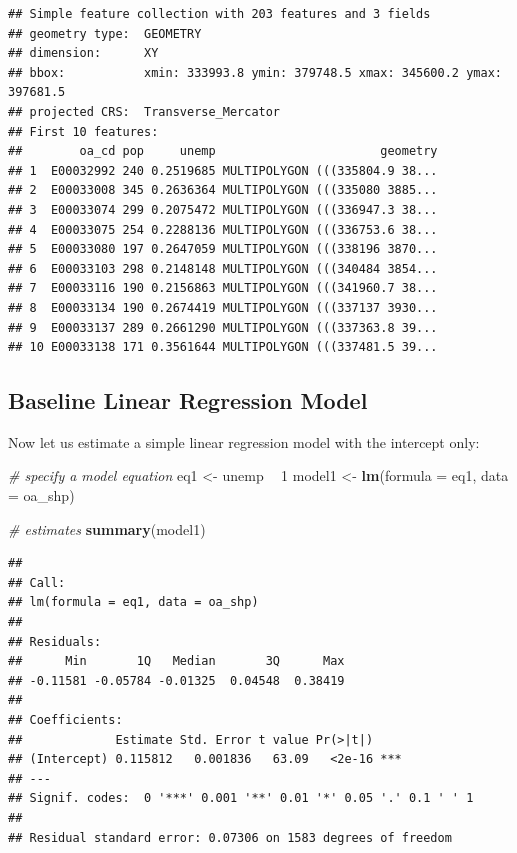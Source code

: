 \documentclass[
]{book}
\newenvironment{Shaded}{\begin{snugshade}}{\end{snugshade}}
\newcommand{\CommentTok}[1]{\textcolor[rgb]{0.56,0.35,0.01}{\textit{#1}}}
\newcommand{\DataTypeTok}[1]{\textcolor[rgb]{0.13,0.29,0.53}{#1}}
\newcommand{\DecValTok}[1]{\textcolor[rgb]{0.00,0.00,0.81}{#1}}
\newcommand{\KeywordTok}[1]{\textcolor[rgb]{0.13,0.29,0.53}{\textbf{#1}}}
\newcommand{\NormalTok}[1]{#1}
\newcommand{\OperatorTok}[1]{\textcolor[rgb]{0.81,0.36,0.00}{\textbf{#1}}}
\newcommand{\StringTok}[1]{\textcolor[rgb]{0.31,0.60,0.02}{#1}}
\begin{document}
\begin{verbatim}
## Simple feature collection with 203 features and 3 fields
## geometry type:  GEOMETRY
## dimension:      XY
## bbox:           xmin: 333993.8 ymin: 379748.5 xmax: 345600.2 ymax: 397681.5
## projected CRS:  Transverse_Mercator
## First 10 features:
##        oa_cd pop     unemp                       geometry
## 1  E00032992 240 0.2519685 MULTIPOLYGON (((335804.9 38...
## 2  E00033008 345 0.2636364 MULTIPOLYGON (((335080 3885...
## 3  E00033074 299 0.2075472 MULTIPOLYGON (((336947.3 38...
## 4  E00033075 254 0.2288136 MULTIPOLYGON (((336753.6 38...
## 5  E00033080 197 0.2647059 MULTIPOLYGON (((338196 3870...
## 6  E00033103 298 0.2148148 MULTIPOLYGON (((340484 3854...
## 7  E00033116 190 0.2156863 MULTIPOLYGON (((341960.7 38...
## 8  E00033134 190 0.2674419 MULTIPOLYGON (((337137 3930...
## 9  E00033137 289 0.2661290 MULTIPOLYGON (((337363.8 39...
## 10 E00033138 171 0.3561644 MULTIPOLYGON (((337481.5 39...
\end{verbatim}

\hypertarget{baseline-linear-regression-model}{%
\subsection{Baseline Linear Regression Model}\label{baseline-linear-regression-model}}

Now let us estimate a simple linear regression model with the intercept only:

\begin{Shaded}
\begin{Highlighting}[]
\CommentTok{# specify a model equation}
\NormalTok{eq1 <-}\StringTok{ }\NormalTok{unemp }\OperatorTok{~}\StringTok{ }\DecValTok{1}
\NormalTok{model1 <-}\StringTok{ }\KeywordTok{lm}\NormalTok{(}\DataTypeTok{formula =}\NormalTok{ eq1, }\DataTypeTok{data =}\NormalTok{ oa_shp)}

\CommentTok{# estimates}
\KeywordTok{summary}\NormalTok{(model1)}
\end{Highlighting}
\end{Shaded}

\begin{verbatim}
## 
## Call:
## lm(formula = eq1, data = oa_shp)
## 
## Residuals:
##      Min       1Q   Median       3Q      Max 
## -0.11581 -0.05784 -0.01325  0.04548  0.38419 
## 
## Coefficients:
##             Estimate Std. Error t value Pr(>|t|)    
## (Intercept) 0.115812   0.001836   63.09   <2e-16 ***
## ---
## Signif. codes:  0 '***' 0.001 '**' 0.01 '*' 0.05 '.' 0.1 ' ' 1
## 
## Residual standard error: 0.07306 on 1583 degrees of freedom
\end{verbatim}
\end{document}
